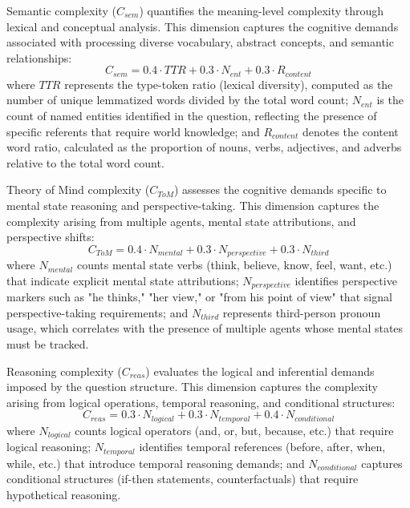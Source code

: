 \documentclass[12pt]{article}
\begin{document}
Semantic complexity ($C_{sem}$) quantifies the meaning-level complexity through lexical and conceptual analysis. This dimension captures the cognitive demands associated with processing diverse vocabulary, abstract concepts, and semantic relationships:
\begin{equation}
C_{sem} = 0.4 \cdot TTR + 0.3 \cdot N_{ent} + 0.3 \cdot R_{content}
\end{equation}
where $TTR$ represents the type-token ratio (lexical diversity), computed as the number of unique lemmatized words divided by the total word count; $N_{ent}$ is the count of named entities identified in the question, reflecting the presence of specific referents that require world knowledge; and $R_{content}$ denotes the content word ratio, calculated as the proportion of nouns, verbs, adjectives, and adverbs relative to the total word count.

Theory of Mind complexity ($C_{ToM}$) assesses the cognitive demands specific to mental state reasoning and perspective-taking. This dimension captures the complexity arising from multiple agents, mental state attributions, and perspective shifts:
\begin{equation}
C_{ToM} = 0.4 \cdot N_{mental} + 0.3 \cdot N_{perspective} + 0.3 \cdot N_{third}
\end{equation}
where $N_{mental}$ counts mental state verbs (think, believe, know, feel, want, etc.) that indicate explicit mental state attributions; $N_{perspective}$ identifies perspective markers such as "he thinks," "her view," or "from his point of view" that signal perspective-taking requirements; and $N_{third}$ represents third-person pronoun usage, which correlates with the presence of multiple agents whose mental states must be tracked.

Reasoning complexity ($C_{reas}$) evaluates the logical and inferential demands imposed by the question structure. This dimension captures the complexity arising from logical operations, temporal reasoning, and conditional structures:
\begin{equation}
C_{reas} = 0.3 \cdot N_{logical} + 0.3 \cdot N_{temporal} + 0.4 \cdot N_{conditional}
\end{equation}
where $N_{logical}$ counts logical operators (and, or, but, because, etc.) that require logical reasoning; $N_{temporal}$ identifies temporal references (before, after, when, while, etc.) that introduce temporal reasoning demands; and $N_{conditional}$ captures conditional structures (if-then statements, counterfactuals) that require hypothetical reasoning.
\end{document}
